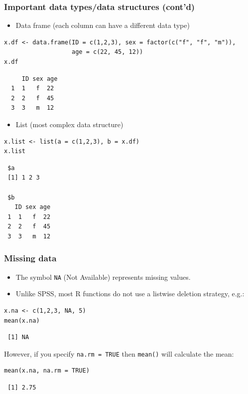 \documentclass[bigger]{beamer}
\begin{document}
\begin{frame}[fragile,shrink = 15]
\frametitle{Important data types/data structures (cont'd)}
\label{sec-1-2-10}

\begin{itemize}
\item Data frame (each column can have a different data type)
\end{itemize}

\lstset{language=R}
\begin{lstlisting}
x.df <- data.frame(ID = c(1,2,3), sex = factor(c("f", "f", "m")), 
                   age = c(22, 45, 12))
x.df
\end{lstlisting}

\begin{verbatim}
     ID sex age
  1  1   f  22
  2  2   f  45
  3  3   m  12
\end{verbatim}

 
\begin{itemize}
\item List (most complex data structure)
\end{itemize}

\lstset{language=R}
\begin{lstlisting}
x.list <- list(a = c(1,2,3), b = x.df)
x.list
\end{lstlisting}

\begin{verbatim}
 $a
 [1] 1 2 3
 
 $b
   ID sex age
 1  1   f  22
 2  2   f  45
 3  3   m  12
\end{verbatim}
\end{frame}
\begin{frame}[fragile]
\frametitle{Missing data}
\label{sec-1-2-11}

\begin{itemize}
\item The symbol \texttt{NA} (Not Available) represents missing values.
\item Unlike SPSS, most R functions do not use a listwise deletion strategy, e.g.:
\end{itemize}

\lstset{language=R}
\begin{lstlisting}
x.na <- c(1,2,3, NA, 5)
mean(x.na)
\end{lstlisting}

\begin{verbatim}
 [1] NA
\end{verbatim}

    However, if you specify \texttt{na.rm = TRUE} then \texttt{mean()} will calculate the mean:


\lstset{language=R}
\begin{lstlisting}
mean(x.na, na.rm = TRUE)
\end{lstlisting}

\begin{verbatim}
 [1] 2.75
\end{verbatim}

\end{frame}
\end{document}
